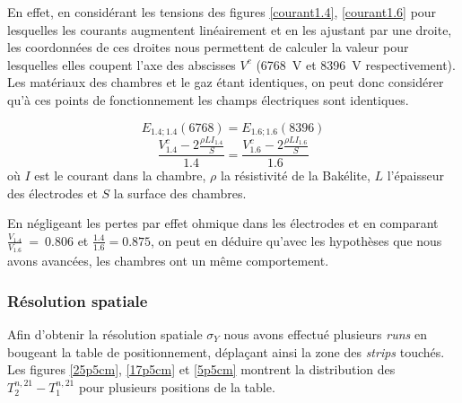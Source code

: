 En effet, en considérant les tensions des figures \ref{courant1.4}, \ref{courant1.6} pour lesquelles les courants augmentent linéairement et en les ajustant par une droite, les coordonnées de ces droites nous permettent de calculer la valeur pour lesquelles elles coupent l'axe des abscisses $V^c$ (\SI{6768}{\volt} et \SI{8396}{\volt} respectivement). Les matériaux des chambres et le gaz étant identiques, on peut donc considérer qu'à ces points de fonctionnement les champs électriques sont identiques.

\begin{equation}
E_{\num{1.4};\num{1.4}}\left( 6768 \right)=E_{\num{1.6};\num{1.6}}\left( 8396 \right)
\end{equation} 
\begin{equation}
\frac{V^c_{1.4}-2\frac{\rho L I_{1.4}}{S} }{1.4}=\frac{V^c_{1.6}-2\frac{\rho L I_{1.6}}{S} }{1.6}
\end{equation} 
où $I$ est le courant dans la chambre, $\rho$ la résistivité de la Bakélite, $L$ l'épaisseur des électrodes et $S$ la surface des chambres.

En négligeant les pertes par effet ohmique dans les électrodes et en comparant $\frac{V_{1.4}}{V_{1.6}}~=~\num{0.806}$ et $\frac{1.4}{1.6}=\num{0.875}$, on peut en déduire qu'avec les hypothèses que nous avons avancées, les chambres ont un même comportement.

\subsubsection{Résolution spatiale}

Afin d'obtenir la résolution spatiale $\sigma_{Y}$ nous avons effectué plusieurs \textit{runs} en bougeant la table de positionnement, déplaçant ainsi la zone des \textit{strips} touchés. Les figures \ref{25p5cm}, \ref{17p5cm} et \ref{5p5cm} montrent la distribution des $T^{n,21}_2-T^{n,21}_1$ pour plusieurs positions de la table. 

